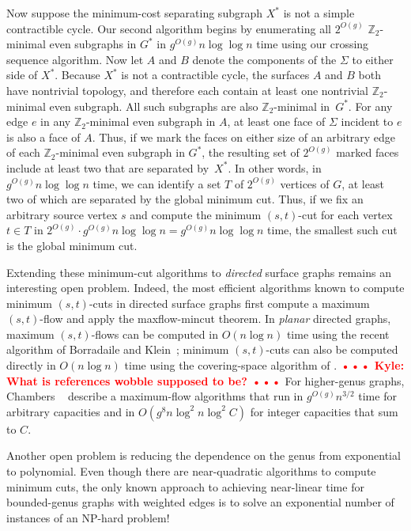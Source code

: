\documentclass[natbib]{svcyclop}
\def\NOTE#1{\textcolor{Red}{\textbf{\textsf{••• #1 •••}}}}
\def\Z{\mathbb{Z}}
\begin{document}
Now suppose the minimum-cost separating subgraph $X^*$ is not a simple contractible cycle.  Our second algorithm begins by enumerating all $2^{O(g)}$ $\Z_2$-minimal even subgraphs in $G^*$ in $g^{O(g)}n\log\log n$ time using our crossing sequence algorithm.  Now let $A$ and $B$ denote the components of the $\Sigma$ to either side of $X^*$.  Because $X^*$ is not a contractible cycle, the surfaces $A$ and $B$ both have nontrivial topology, and therefore each contain at least one nontrivial $\Z_2$-minimal even subgraph.  All such subgraphs are also $\Z_2$-minimal in~$G^*$.  For any edge $e$ in any $\Z_2$-minimal even subgraph in $A$, at least one face of $\Sigma$ incident to $e$ is also a face of $A$.  Thus, if we mark the faces on either size of an arbitrary edge of each $\Z_2$-minimal even subgraph in $G^*$, the resulting set of $2^{O(g)}$ marked faces include at least two that are separated by~$X^*$.  In other words, in $g^{O(g)}n\log\log n$ time, we can identify a set $T$ of $2^{O(g)}$ vertices of $G$, at least two of which are separated by the global minimum cut.  Thus, if we fix an arbitrary source vertex $s$ and compute the minimum $(s,t)$-cut for each vertex $t\in T$ in $2^{O(g)}\cdot g^{O(g)}n\log\log n = g^{O(g)}n\log\log n$ time, the smallest such cut is the global minimum cut.




\OpenProb

Extending these minimum-cut algorithms to \emph{directed} surface graphs remains an interesting open problem.  Indeed, the most efficient algorithms known to compute minimum $(s,t)$-cuts in directed surface graphs first compute a maximum $(s,t)$-flow and apply the maxflow-mincut theorem.  In \emph{planar} directed graphs, maximum $(s,t)$-flows can be computed in $O(n\log n)$ time using the recent algorithm of Borradaile and Klein~\cite{bk-amfdp-09}; minimum $(s,t)$-cuts can also be computed directly in $O(n\log n)$ time using the covering-space algorithm of \cite{wobble}.
\NOTE{Kyle: What is references wobble supposed to be?}
For higher-genus graphs, Chambers \etal~\cite{cen-hfcc-12} describe a  maximum-flow algorithms that run in $g^{O(g)}n^{3/2}$ time for arbitrary capacities and in $O(g^8 n\log^2 n \log^2 C)$ for integer capacities that sum to $C$.

Another open problem is reducing the dependence on the genus from exponential to polynomial.  Even though there are near-quadratic algorithms to compute minimum cuts, the only known approach to achieving near-linear time for bounded-genus graphs with weighted edges is to solve an exponential number of instances of an NP-hard problem!
\end{document}
